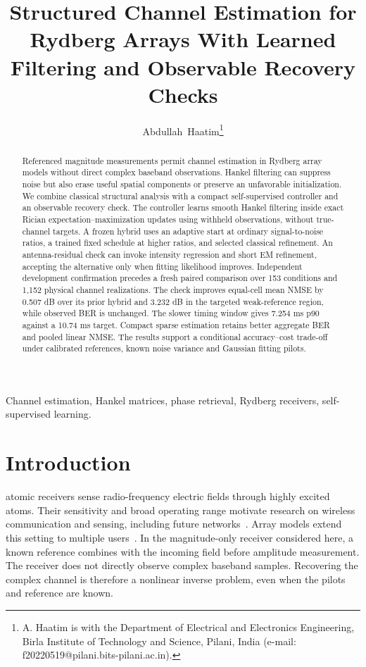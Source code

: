 \documentclass[10pt,journal,letterpaper]{IEEEtran}
\begin{document}
\title{Structured Channel Estimation for Rydberg Arrays With Learned Filtering and Observable Recovery Checks}
\author{Abdullah~Haatim\thanks{A. Haatim is with the Department of Electrical and Electronics Engineering, Birla Institute of Technology and Science, Pilani, India (e-mail: f20220519@pilani.bits-pilani.ac.in).}}
\maketitle
\begin{abstract}
Referenced magnitude measurements permit channel estimation in Rydberg array models without direct complex baseband observations. Hankel filtering can suppress noise but also erase useful spatial components or preserve an unfavorable initialization. We combine classical structural analysis with a compact self-supervised controller and an observable recovery check. The controller learns smooth Hankel filtering inside exact Rician expectation--maximization updates using withheld observations, without true-channel targets. A frozen hybrid uses an adaptive start at ordinary signal-to-noise ratios, a trained fixed schedule at higher ratios, and selected classical refinement. An antenna-residual check can invoke intensity regression and short EM refinement, accepting the alternative only when fitting likelihood improves. Independent development confirmation precedes a fresh paired comparison over 153 conditions and 1,152 physical channel realizations. The check improves equal-cell mean NMSE by 0.507 dB over its prior hybrid and 3.232 dB in the targeted weak-reference region, while observed BER is unchanged. The slower timing window gives 7.254 ms p90 against a 10.74 ms target. Compact sparse estimation retains better aggregate BER and pooled linear NMSE. The results support a conditional accuracy--cost trade-off under calibrated references, known noise variance and Gaussian fitting pilots.
\end{abstract}
\begin{IEEEkeywords}
Channel estimation, Hankel matrices, phase retrieval, Rydberg receivers, self-supervised learning.
\end{IEEEkeywords}

\section{Introduction}
 atomic receivers sense radio-frequency electric fields through highly excited atoms. Their sensitivity and broad operating range motivate research on wireless communication and sensing, including future networks~\cite{gong2025mag}. Array models extend this setting to multiple users~\cite{cui2025}. In the magnitude-only receiver considered here, a known reference combines with the incoming field before amplitude measurement. The receiver does not directly observe complex baseband samples. Recovering the complex channel is therefore a nonlinear inverse problem, even when the pilots and reference are known.
\end{document}
